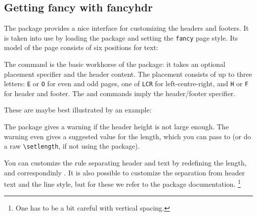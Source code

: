 %
%
\subsection{Getting fancy with \textsf{fancyhdr}}

The  package provides a nice interface for customizing the headers and footers.
It is taken into use by loading the package and setting the \verb|fancy| page style.
Its model of the page consists of six positions for text:
%
\begin{center}
\end{center}

The  command is the basic workhorse of the package:
it takes an optional placement specifier and the header content.
The placement consists of up to three letters:
\verb|E| or \verb|O| for even and odd pages, one of \verb|LCR| for left-centre-right,
and \verb|H| or \verb|F| for header and footer.
The  and  commands imply the header/footer specifier.

These are maybe best illustrated by an example:
%
\begin{ExampleCode}
\pagestyle{fancy}

\fancyhf[]{}

\fancyfoot[C]{\thepage}

\end{ExampleCode}


\begin{remark}
The package gives a warning if the header height is not large enough.
The warning even gives a suggested value for the  length,
which you can pass to  (or do a raw \verb|\setlength|, if not using the package).
\end{remark}

You can customize the rule separating header and text by redefining the
 length, and correspondinly .
It is also possible to customize the separation from header text and the line style,
but for these we refer to the package documentation.%
\footnote{One has to be a bit careful with vertical spacing.}
